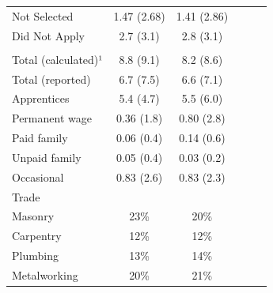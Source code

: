 \documentclass[
  11pt,
a4paper
]{article}
\begin{document}
\begin{table}[H]
\begin{threeparttable}
{\begin{tabular}[t]{lccccc}
\hspace{1em}\hspace{1em}Not Selected & 1.47 (2.68) & 1.41 (2.86) &  &  & \\
\hspace{1em}\hspace{1em}Did Not Apply & 2.7 (3.1) & 2.8 (3.1) &  &  & \\
\addlinespace[0.3em]
\multicolumn{6}{l}{\hspace{1em}Firm size}\\
\hspace{1em}\hspace{1em}Total (calculated)¹ & 8.8 (9.1) & 8.2 (8.6) &  &  & \\
\hspace{1em}\hspace{1em}Total (reported) & 6.7 (7.5) & 6.6 (7.1) &  &  & \\
\hspace{1em}\hspace{1em}Apprentices & 5.4 (4.7) & 5.5 (6.0) &  &  & \\
\hspace{1em}\hspace{1em}Permanent wage & 0.36 (1.8) & 0.80 (2.8) &  &  & \\
\hspace{1em}\hspace{1em}Paid family & 0.06 (0.4) & 0.14 (0.6) &  &  & \\
\hspace{1em}\hspace{1em}Unpaid family & 0.05 (0.4) & 0.03 (0.2) &  &  & \\
\hspace{1em}\hspace{1em}Occasional & 0.83 (2.6) & 0.83 (2.3) &  &  & \\
\hspace{1em}Trade &  &  &  &  & \\
\hspace{1em}\hspace{1em}Masonry & 23\% & 20\% &  &  & \\
\hspace{1em}\hspace{1em}Carpentry & 12\% & 12\% &  &  & \\
\hspace{1em}\hspace{1em}Plumbing & 13\% & 14\% &  &  & \\
\hspace{1em}\hspace{1em}Metalworking & 20\% & 21\% &  &  & \\

\end{tabular}}
\end{threeparttable}
\end{table}
\end{document}
